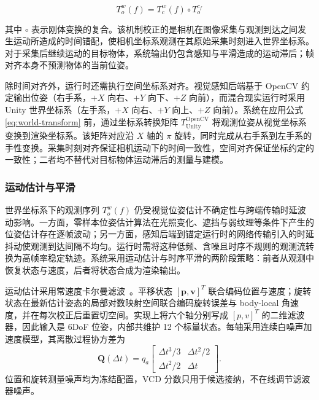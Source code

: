 \documentclass[review]{vgtc}
\begin{document}
\begin{equation}
T_o^w (f) = T_c^w (f) \circ T_o^{c_f}
\label{eq:world-transform}
\end{equation}


其中 $\circ$ 表示刚体变换的复合。该机制校正的是相机在图像采集与观测到达之间发生运动所造成的时间错配，使相机坐标系观测在其原始采集时刻进入世界坐标系。对于采集后继续运动的目标物体，系统输出仍包含感知与平滑造成的运动滞后；帧对齐本身不预测物体的当前位姿。

除时间对齐外，运行时还需执行空间坐标系对齐。视觉感知后端基于 OpenCV 约定输出位姿（右手系，$+X$ 向右、$+Y$ 向下、$+Z$ 向前），而混合现实运行时采用 Unity 世界坐标系（左手系，$+X$ 向右、$+Y$ 向上、$+Z$ 向前）。系统在应用公式 \ref{eq:world-transform} 前，通过坐标系转换矩阵 $T_{\mathrm{Unity}}^{\mathrm{OpenCV}}$ 将观测位姿从视觉坐标系变换到渲染坐标系。该矩阵对应沿 $X$ 轴的 $\pi$ 旋转，同时完成从右手系到左手系的手性变换。采集时刻对齐保证相机运动下的时间一致性，空间对齐保证坐标约定的一致性；二者均不替代对目标物体运动滞后的测量与建模。

\subsubsection{运动估计与平滑}\label{sec:smoothing}


世界坐标系下的观测序列 ${T_o^w (f)}$ 仍受视觉位姿估计不确定性与跨端传输时延波动影响。一方面，零样本位姿估计算法在光照变化、遮挡与弱纹理等条件下产生的位姿估计存在逐帧波动；另一方面，感知后端到锚定运行时的网络传输引入的时延抖动使观测到达间隔不均匀。运行时需将这种低频、含噪且时序不规则的观测流转换为高帧率稳定轨迹。系统采用运动估计与时序平滑的两阶段策略：前者从观测中恢复状态与速度，后者将状态合成为渲染输出。

运动估计采用常速度卡尔曼滤波~\cite{kalman1960new}。平移状态 $[\mathbf{p},\mathbf{v}]^T$ 联合编码位置与速度；旋转状态在最新估计姿态的局部对数映射空间联合编码旋转误差与 body-local 角速度，并在每次校正后重置切空间。实现上将六个轴分别写成 $[p,v]^T$ 的二维滤波器，因此输入是 6DoF 位姿，内部共维护 12 个标量状态。每轴采用连续白噪声加速度模型，其离散过程协方差为
\begin{equation}
\mathbf{Q}(\Delta t)=q_a
\begin{bmatrix}
\Delta t^3/3 & \Delta t^2/2\\
\Delta t^2/2 & \Delta t
\end{bmatrix}.
\end{equation}
位置和旋转测量噪声均为冻结配置，VCD 分数只用于候选接纳，不在线调节滤波器噪声。
\end{document}
